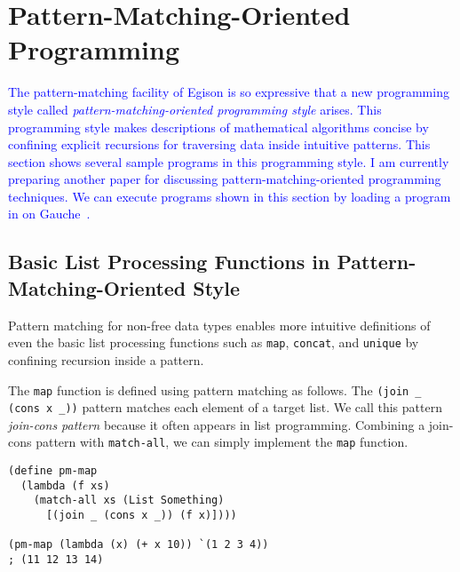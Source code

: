 \documentclass[acmlarge]{acmart}
\newcommand{\new}[1]{\textcolor{blue}{#1}}
\begin{document}



\newpage

\appendix

\section{Pattern-Matching-Oriented Programming}\label{apps}

\new{
The pattern-matching facility of Egison is so expressive that a new programming style called \emph{pattern-matching-oriented programming style} arises.
This programming style makes descriptions of mathematical algorithms concise by confining explicit recursions for traversing data inside intuitive patterns.
This section shows several sample programs in this programming style.
I am currently preparing another paper for discussing pattern-matching-oriented programming techniques.
We can execute programs shown in this section by loading a program in \cite{egisonScheme} on Gauche~\cite{gaucheWeb}.
}%

\subsection{Basic List Processing Functions in Pattern-Matching-Oriented Style}\label{pmo-list}

Pattern matching for non-free data types enables more intuitive definitions of even the basic list processing functions such as \lstinline{map}, \lstinline{concat}, and \lstinline{unique} by confining recursion inside a pattern.

The \lstinline{map} function is defined using pattern matching as follows.
The \lstinline{(join _ (cons x _))} pattern matches each element of a target list.
We call this pattern \emph{join-cons pattern} because it often appears in list programming.
Combining a join-cons pattern with \lstinline{match-all}, we can simply implement the \lstinline{map} function.

\begin{lstlisting}[language=egison]
(define pm-map
  (lambda (f xs)
    (match-all xs (List Something)
      [(join _ (cons x _)) (f x)])))

(pm-map (lambda (x) (+ x 10)) `(1 2 3 4))
; (11 12 13 14)
\end{lstlisting}
\end{document}
